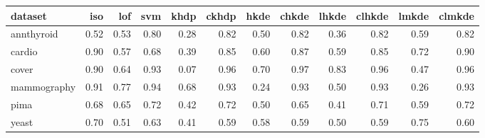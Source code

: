 \begin{tabular}{lrrrrrrrrrrr}
  \hline
dataset & iso & lof & svm & khdp & ckhdp & hkde & chkde & lhkde & clhkde & lmkde & clmkde \\ 
  \hline
annthyroid & 0.52 & 0.53 & 0.80 & 0.28 & 0.82 & 0.50 & 0.82 & 0.36 & 0.82 & 0.59 & 0.82 \\ 
  cardio & 0.90 & 0.57 & 0.68 & 0.39 & 0.85 & 0.60 & 0.87 & 0.59 & 0.85 & 0.72 & 0.90 \\ 
  cover & 0.90 & 0.64 & 0.93 & 0.07 & 0.96 & 0.70 & 0.97 & 0.83 & 0.96 & 0.47 & 0.96 \\ 
  mammography & 0.91 & 0.77 & 0.94 & 0.68 & 0.93 & 0.24 & 0.93 & 0.50 & 0.93 & 0.26 & 0.93 \\ 
  pima & 0.68 & 0.65 & 0.72 & 0.42 & 0.72 & 0.50 & 0.65 & 0.41 & 0.71 & 0.59 & 0.72 \\ 
  yeast & 0.70 & 0.51 & 0.63 & 0.41 & 0.59 & 0.58 & 0.59 & 0.50 & 0.59 & 0.75 & 0.60 \\ 
   \hline
\end{tabular}
